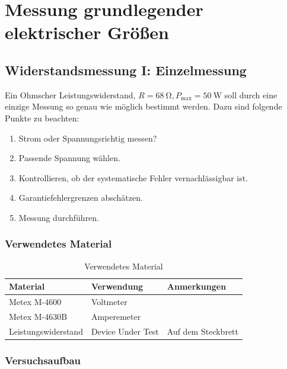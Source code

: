 \newpage
\section{Messung grundlegender elektrischer Größen}\label{sec:1}

\subsection{Widerstandsmessung I: Einzelmessung}\label{sec:1-1}

\begin{highlightblock}
Ein Ohmscher Leistungswiderstand, $R=\SI{68}{\ohm}, P_{\max}=\SI{50}{\watt}$ soll durch eine einzige Messung
so genau wie möglich bestimmt werden. Dazu sind folgende Punkte zu beachten:
\begin{enumerate}[label=\textbf{\alph*:}, ref=\alph*, noitemsep]
    \item\label{itm:1-P1-1} Strom oder Spannungsrichtig messen?
    \item\label{itm:1-P1-2} Passende Spannung wählen.
    \item\label{itm:1-P1-3} Kontrollieren, ob der systematische Fehler vernachlässigbar ist.
    \item\label{itm:1-P1-4} Garantiefehlergrenzen abschätzen.
    \item\label{itm:1-P1-5} Messung durchführen.
\end{enumerate}
\end{highlightblock}

\subsubsection{Verwendetes Material}

\begin{table}[h]
	\centering
	\caption{Verwendetes Material}
	\begin{tabularx}{\textwidth}{XXX}
		\textbf{Material} & \textbf{Verwendung} & \textbf{Anmerkungen}\\ \midrule
		Metex M-4600 & Voltmeter &  \\
		Metex M-4630B & Amperemeter &  \\
		Leistungswiderstand & Device Under Test & Auf dem Steckbrett \\
	\end{tabularx}	
\end{table}

\subsubsection{Versuchsaufbau}

